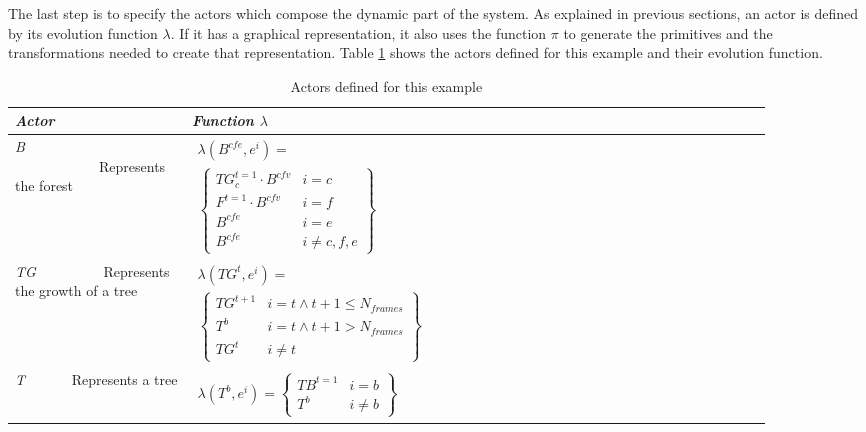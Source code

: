 \documentclass[10pt,journal,letterpaper,compsoc]{IEEEtran}
\begin{document}
The last step is to specify the actors which compose the dynamic part of the system. As explained in previous sections, an actor is defined by its evolution function $\lambda$. If it has a graphical representation, it also uses the function $\pi$ to generate the primitives and the transformations needed to create that representation. Table \ref{table4} shows the actors defined for this example and their evolution function.


\begin{table}[h]
\caption{Actors defined for this example}
\label{table4}
\begin{small}
\begin{center}
\begin{tabular}{|p{0.18\linewidth}|p{0.7\linewidth}|}

    \hline
    \itshape Actor & \itshape Function ${\lambda}$\\

    \hline 
    \textit{B} \ \ \  \ \ \ \ \ \ \ \ \    Represents the forest &
    $\begin{array}{l}
    \lambda(B^{cfe}, e^{i}) =\\
    \left\{
    \begin{array}{ll}
        TG_c^{t=1} \cdot B^{cfv}       & i = c \\
        F^{t=1}   \cdot B^{cfv}       & i = f \\
        B^{cfe}                        & i = e \\
        B^{cfe}                        & i \neq c,f,e
    \end{array} \right\}
    \end{array}$ \\

    \hline 
	\vspace{-0.1cm}    
    \textit{TG} \ \ \ \ \ \ \ \ \   Represents the growth of a tree &
    $\begin{array}{l}
    \lambda(TG^{t},e^{i}) =\\
    \left\{
    \begin{array}{ll}
        TG^{t+1} & i=t \wedge t+1 \leqslant N_{frames} \\
        T^{b} & i=t \wedge t+1>N_{frames}\\
        TG^{t} & i \neq t
    \end{array}\right\}
    \end{array}$ \\

    \hline \textit{T}  \ \ \  \ \ \  Represents a tree &
    $\begin{array}{l}
    \lambda (T^{b},e^{i}) = \left\{
    \begin{array}{ll}
        TB^{t=1}  & i=b \\
        T^{b} & i\neq b
    \end{array}\right\}
    \end{array}$ \\


\end{tabular}
\end{center}
\end{small}
\end{table}
\end{document}
